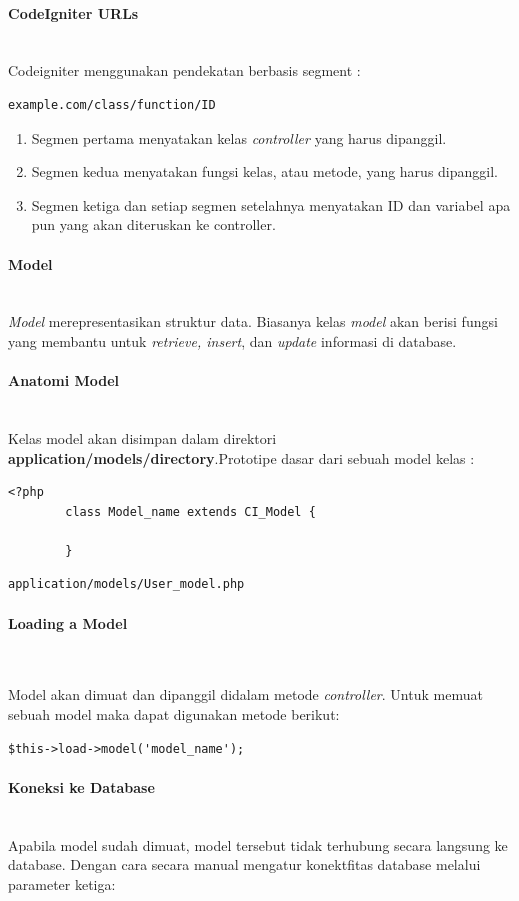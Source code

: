 \documentclass[a4paper,twoside]{article}
\newcommand{\myparagraph}[1]{\paragraph{#1}\mbox{}\\}
\begin{document}
\begin{enumerate}
		\myparagraph{CodeIgniter URLs}
		\label{subs:urls}
		Codeigniter menggunakan pendekatan berbasis segment :
		\begin{lstlisting}[frame=single] 
		example.com/class/function/ID
		\end{lstlisting}
		
		\begin{enumerate}
			\item Segmen pertama menyatakan kelas \textit{controller} yang harus dipanggil.
			\item Segmen kedua menyatakan fungsi kelas, atau metode, yang harus dipanggil.
			\item Segmen ketiga dan setiap segmen setelahnya menyatakan ID dan variabel apa pun yang akan diteruskan ke controller.
		\end{enumerate}
		
		\myparagraph{Model}
		\label{subs:model}
		\textit{Model} merepresentasikan struktur data. Biasanya kelas \textit {model} akan berisi fungsi yang membantu untuk \textit{retrieve, insert}, dan \textit{update} informasi di database.
		
		\myparagraph{Anatomi Model}
		\label{sssec:model_1}
		Kelas model akan disimpan dalam direktori \textbf{application/models/directory}.Prototipe dasar dari sebuah model kelas :
		
		\begin{lstlisting}[frame=single]  
		<?php
		class Model_name extends CI_Model {
		
		}
		\end{lstlisting}
		
		\begin{lstlisting}[frame=single]  
		application/models/User_model.php
		\end{lstlisting}
		
		\myparagraph{Loading a Model}
		\label{sssec:model_2}
		
		Model akan dimuat dan dipanggil didalam metode \textit{controller}. Untuk memuat sebuah model maka dapat digunakan metode berikut:
		
		\begin{lstlisting}[frame=single] 
		$this->load->model('model_name');
		\end{lstlisting}
		
		\myparagraph{Koneksi ke Database}
		\label{sssec:model_3}
		Apabila model sudah dimuat, model tersebut tidak terhubung secara langsung ke database. Dengan cara secara manual mengatur konektfitas database melalui parameter ketiga:
		

\end{enumerate}
\end{document}
